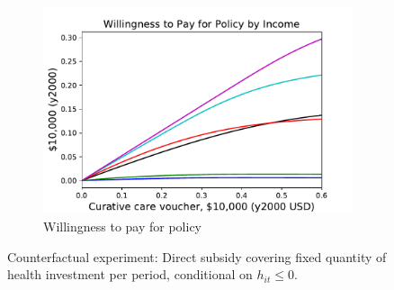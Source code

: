 \documentclass[12pt,pdftex,letterpaper]{article}
\newcommand{\Health}{h}
\begin{document}
\begin{figure}[h!]
\begin{subfigure}[b]{0.49\textwidth}
        \includegraphics[width=\textwidth]{../Figures/CurativeSubWTP.pdf}
        \caption{Willingness to pay for policy}
    \end{subfigure}
    \caption{Counterfactual experiment: Direct subsidy covering fixed quantity of health investment per period, conditional on $\Health_{it} \leq 0$.}
    \label{fig:CurativeSub}
\end{figure}


\newpage
\end{document}
